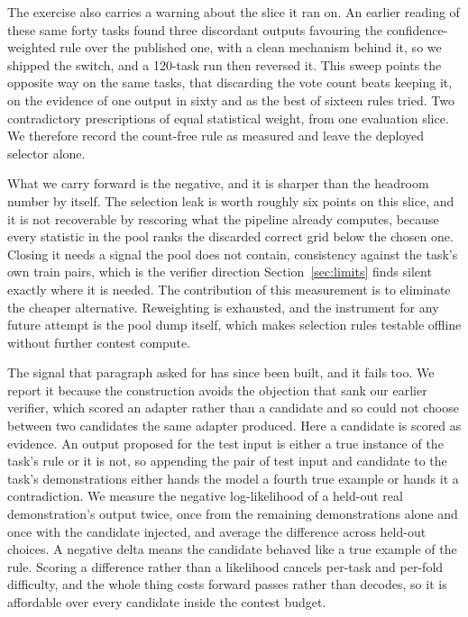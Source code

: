 \documentclass[11pt]{article}
\begin{document}
The exercise also carries a warning about the slice it ran on. An earlier reading of these same forty tasks
found three discordant outputs favouring the confidence-weighted rule over the published one, with a clean
mechanism behind it, so we shipped the switch, and a 120-task run then reversed it. This sweep points the
opposite way on the same tasks, that discarding the vote count beats keeping it, on the evidence of one
output in sixty and as the best of sixteen rules tried. Two contradictory prescriptions of equal statistical
weight, from one evaluation slice. We therefore record the count-free rule as measured and leave the
deployed selector alone.

What we carry forward is the negative, and it is sharper than the headroom number by itself. The selection
leak is worth roughly six points on this slice, and it is not recoverable by rescoring what the pipeline
already computes, because every statistic in the pool ranks the discarded correct grid below the chosen one.
Closing it needs a signal the pool does not contain, consistency against the task's own train pairs, which
is the verifier direction Section~\ref{sec:limits} finds silent exactly where it is needed. The contribution
of this measurement is to eliminate the cheaper alternative. Reweighting is exhausted, and the instrument
for any future attempt is the pool dump itself, which makes selection rules testable offline without
further contest compute.

The signal that paragraph asked for has since been built, and it fails too. We report it because
the construction avoids the objection that sank our earlier verifier, which scored an adapter rather than a
candidate and so could not choose between two candidates the same adapter produced. Here a candidate is
scored as evidence. An output proposed for the test input is either a true instance of the task's rule or
it is not, so appending the pair of test input and candidate to the task's demonstrations either hands the
model a fourth true example or hands it a contradiction. We measure the negative log-likelihood of a
held-out real demonstration's output twice, once from the remaining demonstrations alone and once with the
candidate injected, and average the difference across held-out choices. A negative delta means the
candidate behaved like a true example of the rule. Scoring a difference rather than a likelihood cancels
per-task and per-fold difficulty, and the whole thing costs forward passes rather than decodes, so it is
affordable over every candidate inside the contest budget.
\end{document}

